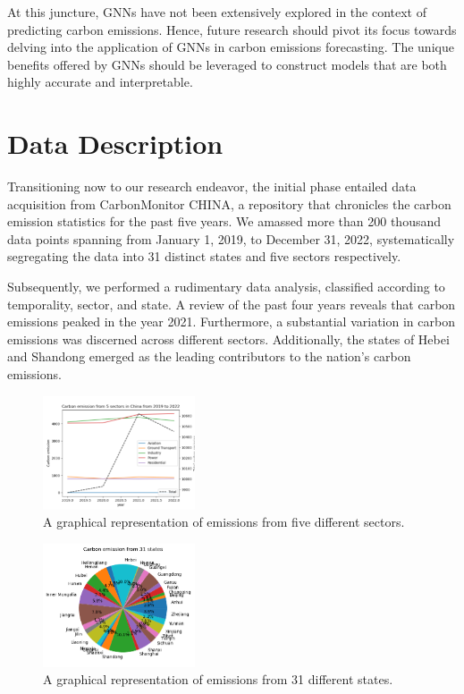 \documentclass[sigconf, authordraft]{acmart}
\begin{document}
	At this juncture, GNNs have not been extensively explored in the context of predicting
	carbon emissions. Hence, future research should pivot its focus towards delving
	into the application of GNNs in carbon emissions forecasting. The unique
	benefits offered by GNNs should be leveraged to construct models that are both
	highly accurate and interpretable.

	\section{Data Description}
	Transitioning now to our research endeavor, the initial phase entailed data acquisition
	from CarbonMonitor CHINA, a repository that chronicles the carbon emission
	statistics for the past five years. We amassed more than 200 thousand data points
	spanning from January 1, 2019, to December 31, 2022, systematically segregating
	the data into 31 distinct states and five sectors respectively.

	Subsequently, we performed a rudimentary data analysis, classified according to
	temporality, sector, and state. A review of the past four years reveals that
	carbon emissions peaked in the year 2021. Furthermore, a substantial variation
	in carbon emissions was discerned across different sectors. Additionally, the states
	of Hebei and Shandong emerged as the leading contributors to the nation's carbon
	emissions.

	\begin{figure}[ht]
		\centering
		\includegraphics[width=0.4\textwidth]{figures/emissions_from_5_sectors.png}
		\caption{A graphical representation of emissions from five different sectors.}
		\label{fig:emissions_from_5_sectors}
	\end{figure}

	\begin{figure}[ht]
		\centering
		\includegraphics[width=0.4\textwidth]{figures/emissions_from_31_states.png}
		\caption{A graphical representation of emissions from 31 different states.}
		\label{fig:emissions_from_31_states}
	\end{figure}
\end{document}
